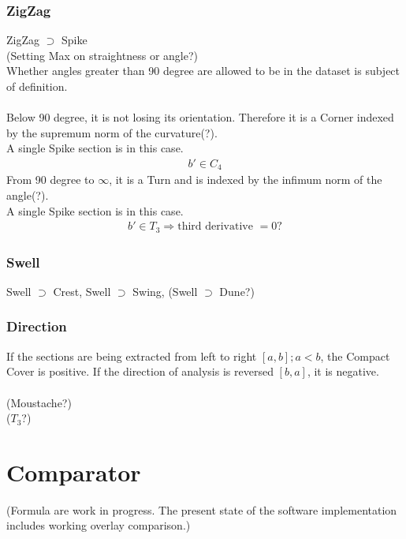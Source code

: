 \documentclass{report}
\begin{document}
\subsection{ZigZag}
ZigZag $\supset$ Spike\\
(Setting Max on straightness or angle?)\\
Whether angles greater than 90 degree are allowed to be in the dataset is subject of definition.\\\\
Below 90 degree, it is not losing its orientation. Therefore it is a Corner indexed by the supremum norm of the curvature(?).\\
A single Spike section is in this case.
\begin{align}
b' \in C_{4}
\end{align}
From 90 degree to $\infty$, it is a Turn and is indexed by the infimum norm of the angle(?).\\
A single Spike section is in this case.
\begin{align}
b' \in T_{3} \Rightarrow \text{third derivative }= 0\text{?}
\end{align}
\subsection{Swell}
Swell $\supset$ Crest, Swell $\supset$ Swing, (Swell $\supset$ Dune?)
\subsection*{Direction}
If the sections are being extracted from left to right $[a,b];a<b$, the Compact Cover is positive. If the direction of analysis is reversed $[b,a]$, it is negative.\\\\
(Moustache?)\\
($T_{3}$?)

\chapter{Comparator}
(Formula are work in progress. The present state of the software implementation includes working overlay comparison.)\\\\
\end{document}
